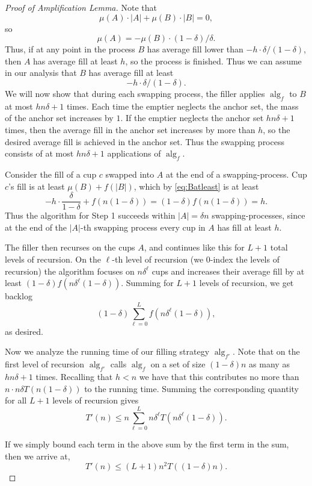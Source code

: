 \documentclass[twocolumn]{article}[10pt]
\DeclareMathOperator{\alg}{\text{alg}}
\begin{document}
\begin{proof}[Proof of Amplification Lemma]
  Note that $$\mu(A) \cdot |A| + \mu(B)\cdot |B| = 0,$$ so
  $$\mu(A) = - \mu(B) \cdot (1-\delta)/ \delta.$$ Thus, if at any
  point in the process $B$ has average fill lower than $-h \cdot
  \delta/(1-\delta)$, then $A$ has average fill at least $h$, so
  the process is finished. Thus we can assume in our analysis
  that $B$ has average fill at least 
  \begin{equation}
  -h\cdot\delta/(1-\delta).
  \label{eq:Batleast}
  \end{equation}
  We will now show that during each swapping process, the filler
  applies $\alg_f$ to $B$ at most $h n \delta + 1$ times. 
  Each time the emptier neglects the anchor set, the mass of the
  anchor set increases by $1$. If the emptier neglects the anchor set $h
  n\delta + 1$ times, then the average fill in the anchor set increases by
  more than $h$, so the desired average fill is achieved in the
  anchor set. Thus the swapping process consists of at most
  $hn\delta + 1$ applications of $\alg_f$.  

  Consider the fill of a cup $c$ swapped into $A$ at the end of a
  swapping-process. Cup $c$'s fill is at least $\mu(B) + f(|B|)$,
  which by \eqref{eq:Batleast} is at least
  $$-h \cdot \frac{\delta}{1-\delta} + f(n (1-\delta)) = (1-\delta)f(n (1-\delta)) = h.$$ 
  Thus the algorithm for Step 1 succeeds within $|A| =
  \delta n$ swapping-processes, since at the end of the $|A|$-th
  swapping process every cup in $A$ has fill at least $h$. 
  
  The filler then recurses on the cups $A$, and continues like
  this for $L + 1$ total levels of recursion. On the $\ell$-th
  level of recursion (we $0$-index the levels of recursion) the
  algorithm focuses on $n\delta^{\ell}$ cups and increases their
  average fill by at least $(1-\delta)f(n\delta^\ell(1-\delta))$.
  Summing for $L+1$ levels of recursion, we get backlog
  $$(1-\delta)\sum_{\ell=0}^L f(n\delta^\ell(1-\delta)),$$ as
  desired.

  Now we analyze the running time of our filling strategy
  $\alg_{f'}$.
  Note that on the first level of recursion $\alg_{f'}$ calls
  $\alg_f$ on a
  set of size $(1-\delta)n$ as many as $hn\delta +1$ times.
  Recalling that $h < n$ we have that this contributes no more
  than $n\cdot n\delta T(n(1-\delta))$ to the running time.
  Summing the corresponding quantity for all $L+1$ levels of
  recursion gives $$T'(n) \le n\sum_{\ell=0}^Ln\delta^\ell
  T(n\delta^\ell (1-\delta)). $$

  If we simply bound each term in the above sum by the first term
  in the sum, then we arrive at, $$T'(n) \le (L+1) n^2
  T((1-\delta)n).$$
\end{proof}
\end{document}
